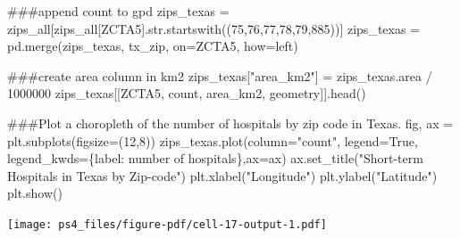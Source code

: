 \documentclass[
  letterpaper,
  DIV=11,
  numbers=noendperiod]{scrartcl}
\newenvironment{Shaded}{\begin{snugshade}}{\end{snugshade}}
\newcommand{\BuiltInTok}[1]{\textcolor[rgb]{0.00,0.23,0.31}{#1}}
\newcommand{\CommentTok}[1]{\textcolor[rgb]{0.37,0.37,0.37}{#1}}
\newcommand{\DecValTok}[1]{\textcolor[rgb]{0.68,0.00,0.00}{#1}}
\newcommand{\NormalTok}[1]{\textcolor[rgb]{0.00,0.23,0.31}{#1}}
\newcommand{\OperatorTok}[1]{\textcolor[rgb]{0.37,0.37,0.37}{#1}}
\newcommand{\StringTok}[1]{\textcolor[rgb]{0.13,0.47,0.30}{#1}}
\newcommand{\VariableTok}[1]{\textcolor[rgb]{0.07,0.07,0.07}{#1}}
\begin{document}
\begin{Shaded}
\begin{Highlighting}[]
\CommentTok{\#\#\#append count to gpd}
\NormalTok{zips\_texas }\OperatorTok{=}\NormalTok{ zips\_all[zips\_all[}\StringTok{\textquotesingle{}ZCTA5\textquotesingle{}}\NormalTok{].}\BuiltInTok{str}\NormalTok{.startswith((}\StringTok{\textquotesingle{}75\textquotesingle{}}\NormalTok{,}\StringTok{\textquotesingle{}76\textquotesingle{}}\NormalTok{,}\StringTok{\textquotesingle{}77\textquotesingle{}}\NormalTok{,}\StringTok{\textquotesingle{}78\textquotesingle{}}\NormalTok{,}\StringTok{\textquotesingle{}79\textquotesingle{}}\NormalTok{,}\StringTok{\textquotesingle{}885\textquotesingle{}}\NormalTok{))]}
\NormalTok{zips\_texas }\OperatorTok{=}\NormalTok{ pd.merge(zips\_texas, tx\_zip, on}\OperatorTok{=}\StringTok{\textquotesingle{}ZCTA5\textquotesingle{}}\NormalTok{, how}\OperatorTok{=}\StringTok{\textquotesingle{}left\textquotesingle{}}\NormalTok{)}

\CommentTok{\#\#\#create area column in km2}
\NormalTok{zips\_texas[}\StringTok{"area\_km2"}\NormalTok{] }\OperatorTok{=}\NormalTok{ zips\_texas.area }\OperatorTok{/} \DecValTok{1000000} 
\NormalTok{zips\_texas[[}\StringTok{\textquotesingle{}ZCTA5\textquotesingle{}}\NormalTok{, }\StringTok{\textquotesingle{}count\textquotesingle{}}\NormalTok{, }\StringTok{\textquotesingle{}area\_km2\textquotesingle{}}\NormalTok{, }\StringTok{\textquotesingle{}geometry\textquotesingle{}}\NormalTok{]].head()}

\CommentTok{\#\#\#Plot a choropleth of the number of hospitals by zip code in Texas.}
\NormalTok{fig, ax }\OperatorTok{=}\NormalTok{ plt.subplots(figsize}\OperatorTok{=}\NormalTok{(}\DecValTok{12}\NormalTok{,}\DecValTok{8}\NormalTok{))}
\NormalTok{zips\_texas.plot(column}\OperatorTok{=}\StringTok{"count"}\NormalTok{, legend}\OperatorTok{=}\VariableTok{True}\NormalTok{, legend\_kwds}\OperatorTok{=}\NormalTok{\{}\StringTok{\textquotesingle{}label\textquotesingle{}}\NormalTok{: }\StringTok{\textquotesingle{}number of hospitals\textquotesingle{}}\NormalTok{\},ax}\OperatorTok{=}\NormalTok{ax)}
\NormalTok{ax.set\_title(}\StringTok{"Short{-}term Hospitals in Texas by Zip{-}code"}\NormalTok{)}
\NormalTok{plt.xlabel(}\StringTok{"Longitude"}\NormalTok{)}
\NormalTok{plt.ylabel(}\StringTok{"Latitude"}\NormalTok{)}
\NormalTok{plt.show()}
\end{Highlighting}
\end{Shaded}

\texttt{[image: ps4\_files/figure-pdf/cell-17-output-1.pdf]}
\end{document}
